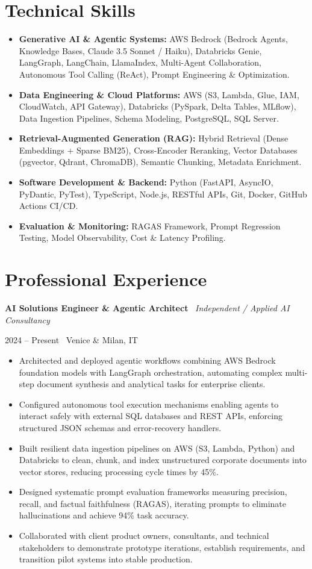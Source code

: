 \documentclass[a4paper,10pt]{article}
\newcommand{\role}[4]{%
  \vspace{2pt}\noindent
  \begin{minipage}[t]{0.70\textwidth}\raggedright\textbf{#1} \textbullet\ \textit{#3}\end{minipage}%
  \hfill
  \begin{minipage}[t]{0.28\textwidth}\raggedleft\footnotesize\color{gray}#2 \textbullet\ #4\end{minipage}%
  \vspace{1pt}%
}
\begin{document}
\section{Technical Skills}
\begin{itemize}[leftmargin=1.2em, itemsep=2pt]
  \item \textbf{Generative AI \& Agentic Systems:} AWS Bedrock (Bedrock Agents, Knowledge Bases, Claude 3.5 Sonnet / Haiku), Databricks Genie, LangGraph, LangChain, LlamaIndex, Multi-Agent Collaboration, Autonomous Tool Calling (ReAct), Prompt Engineering \& Optimization.
  \item \textbf{Data Engineering \& Cloud Platforms:} AWS (S3, Lambda, Glue, IAM, CloudWatch, API Gateway), Databricks (PySpark, Delta Tables, MLflow), Data Ingestion Pipelines, Schema Modeling, PostgreSQL, SQL Server.
  \item \textbf{Retrieval-Augmented Generation (RAG):} Hybrid Retrieval (Dense Embeddings + Sparse BM25), Cross-Encoder Reranking, Vector Databases (pgvector, Qdrant, ChromaDB), Semantic Chunking, Metadata Enrichment.
  \item \textbf{Software Development \& Backend:} Python (FastAPI, AsyncIO, PyDantic, PyTest), TypeScript, Node.js, RESTful APIs, Git, Docker, GitHub Actions CI/CD.
  \item \textbf{Evaluation \& Monitoring:} RAGAS Framework, Prompt Regression Testing, Model Observability, Cost \& Latency Profiling.
\end{itemize}

\section{Professional Experience}

\role{AI Solutions Engineer \& Agentic Architect}{2024 -- Present}{Independent / Applied AI Consultancy}{Venice \& Milan, IT}
\begin{itemize}
  \item Architected and deployed agentic workflows combining AWS Bedrock foundation models with LangGraph orchestration, automating complex multi-step document synthesis and analytical tasks for enterprise clients.
  \item Configured autonomous tool execution mechanisms enabling agents to interact safely with external SQL databases and REST APIs, enforcing structured JSON schemas and error-recovery handlers.
  \item Built resilient data ingestion pipelines on AWS (S3, Lambda, Python) and Databricks to clean, chunk, and index unstructured corporate documents into vector stores, reducing processing cycle times by 45\%.
  \item Designed systematic prompt evaluation frameworks measuring precision, recall, and factual faithfulness (RAGAS), iterating prompts to eliminate hallucinations and achieve 94\% task accuracy.
  \item Collaborated with client product owners, consultants, and technical stakeholders to demonstrate prototype iterations, establish requirements, and transition pilot systems into stable production.
\end{itemize}
\end{document}
